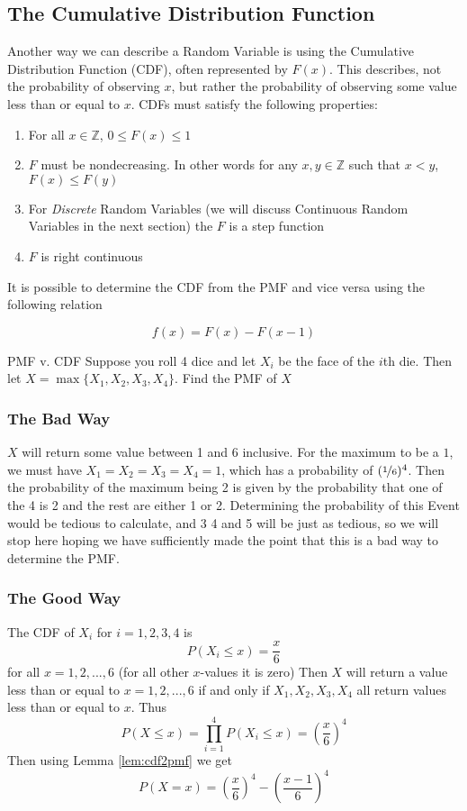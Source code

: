 \documentclass{report}
\begin{document}
\subsection{The Cumulative Distribution Function}
Another way we can describe a Random Variable is using the Cumulative Distribution Function (CDF), often represented by $F(x)$. This describes, not the probability of observing $x$, but rather the probability of observing some value less than or equal to $x$. CDFs must satisfy the following properties:
\begin{enumerate}
    \item For all $x\in\mathbb Z$, $0\le F(x) \le 1$
    \item $F$ must be nondecreasing. In other words for any $x,y\in\mathbb Z$ such that $x<y$, $F(x)\le F(y)$
    \item For \emph{Discrete} Random Variables (we will discuss Continuous Random Variables in the next section) the $F$ is a step function
    \item $F$ is right continuous
\end{enumerate}
\todo

It is possible to determine the CDF from the PMF and vice versa using the following relation
\begin{lemma}
    \[
        f(x)=F(x)-F(x-1)
    \]
\end{lemma}\label{lem:cdf2pmf}


\begin{example}{PMF v. CDF}
    Suppose you roll 4 dice and let $X_i$ be the face of the $i$th die. Then let $X=\max\{X_1, X_2, X_3, X_4\}$. Find the PMF of $X$
\tcblower
\subsubsection{The Bad Way}
$X$ will return some value between 1 and 6 inclusive. For the maximum to be a $1$, we must have $X_1=X_2=X_3=X_4=1$, which has a probability of $(\nicefrac 1 6)^4$. Then the probability of the maximum being 2 is given by the probability that one of the 4 is 2 and the rest are either 1 or 2. Determining the probability of this Event would be tedious to calculate, and 3 4 and 5 will be just as tedious, so we will stop here hoping we have sufficiently made the point that this is a bad way to determine the PMF.

\subsubsection{The Good Way}
The CDF of $X_i$ for $i=1,2,3,4$ is
\[
    P(X_i\le x)=\frac x 6
\]
for all $x=1,2,...,6$ (for all other $x$-values it is zero) Then $X$ will return a value less than or equal to $x=1,2,...,6$ if and only if $X_1, X_2,X_3,X_4$ all return values less than or equal to $x$. Thus
\[
    P(X\le x)=\prod_{i=1}^4 P(X_i\le x)=\left(\frac x 6\right)^4
\]
Then using Lemma \ref{lem:cdf2pmf} we get
\[
    P(X=x)= \left(\frac x 6\right)^4-\left(\frac {x-1} 6\right)^4
\]
\end{example}
\end{document}
